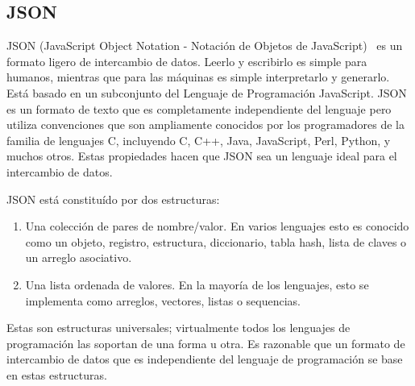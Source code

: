 \subsection{JSON}
\label{json}
JSON (JavaScript Object Notation - Notación de Objetos de JavaScript)~\cite{JSON} 
es un formato ligero de intercambio de datos. Leerlo y escribirlo es simple
 para humanos, mientras que para las máquinas es simple interpretarlo y 
generarlo. Está basado en un subconjunto del Lenguaje de Programación
 JavaScript. JSON es un formato de texto que es completamente independiente
 del lenguaje pero utiliza convenciones que son ampliamente conocidos por los
 programadores de la familia de lenguajes C, incluyendo C, C++, Java, 
JavaScript, Perl, Python, y muchos otros. Estas propiedades hacen que 
JSON sea un lenguaje ideal para el intercambio de datos.

JSON está constituído por dos estructuras:
\begin{enumerate}

\item Una colección de pares de nombre/valor. En varios lenguajes 
esto es conocido como un objeto, registro, estructura, diccionario, 
tabla hash, lista de claves o un arreglo asociativo.
\item Una lista ordenada de valores. En la mayoría de los lenguajes, 
esto se implementa como arreglos, vectores, listas o sequencias.
\end{enumerate}
Estas son estructuras universales; virtualmente todos los lenguajes de
programación las soportan de una forma u otra. Es razonable que un
formato de intercambio de datos que es independiente del lenguaje de
programación se base en estas estructuras.
